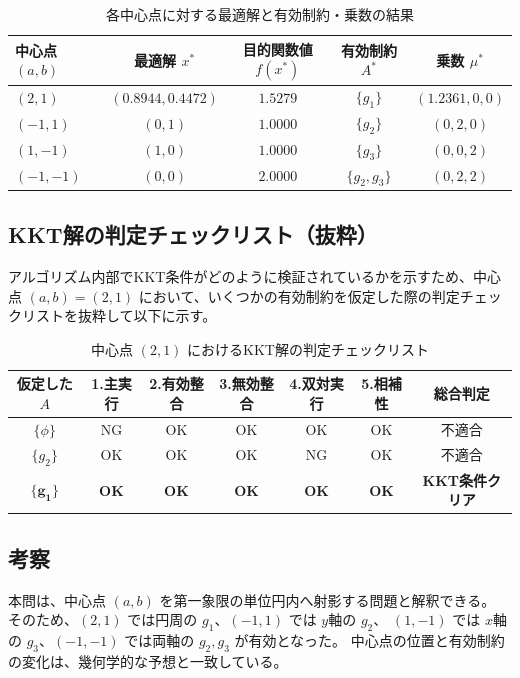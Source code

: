 \documentclass[11pt,a4paper]{ltjsarticle}
\begin{document}
\begin{table}[hbtp]
    \centering
    \caption{各中心点に対する最適解と有効制約・乗数の結果}
    \begin{tabular}{lcccc}
        \toprule
        中心点 $(a,b)$ & 最適解 $x^*$ & 目的関数値 $f(x^*)$ & 有効制約 $A^*$ & 乗数 $\mu^*$ \\
        \midrule
        $(2, 1)$   & $(0.8944, 0.4472)$ & $1.5279$ & $\{g_1\}$ & $(1.2361, 0, 0)$ \\
        $(-1, 1)$  & $(0, 1)$           & $1.0000$ & $\{g_2\}$ & $(0, 2, 0)$ \\
        $(1, -1)$  & $(1, 0)$           & $1.0000$ & $\{g_3\}$ & $(0, 0, 2)$ \\
        $(-1, -1)$ & $(0, 0)$           & $2.0000$ & $\{g_2, g_3\}$ & $(0, 2, 2)$ \\
        \bottomrule
    \end{tabular}
\end{table}

\subsection{KKT解の判定チェックリスト（抜粋）}
アルゴリズム内部でKKT条件がどのように検証されているかを示すため、中心点 $(a,b) = (2,1)$ において、いくつかの有効制約を仮定した際の判定チェックリストを抜粋して以下に示す。

\begin{table}[hbtp]
    \centering
    \caption{中心点 $(2,1)$ におけるKKT解の判定チェックリスト}
    \begin{tabular}{ccccccc}
        \toprule
        仮定した $A$ & 1.主実行 & 2.有効整合 & 3.無効整合 & 4.双対実行 & 5.相補性 & 総合判定 \\
        \midrule
        $\{\phi\}$  & NG & OK & OK & OK & OK & 不適合 \\
        $\{g_2\}$   & OK & OK & OK & NG & OK & 不適合 \\
        $\mathbf{\{g_1\}}$ & \textbf{OK} & \textbf{OK} & \textbf{OK} & \textbf{OK} & \textbf{OK} & \textbf{KKT条件クリア} \\
        \bottomrule
    \end{tabular}
\end{table}

\subsection{考察}
本問は、中心点 $(a,b)$ を第一象限の単位円内へ射影する問題と解釈できる。
そのため、$(2,1)$ では円周の $g_1$、$(-1,1)$ では $y$軸の $g_2$、
$(1,-1)$ では $x$軸の $g_3$、$(-1,-1)$ では両軸の $g_2,g_3$ が有効となった。
中心点の位置と有効制約の変化は、幾何学的な予想と一致している。
\end{document}
